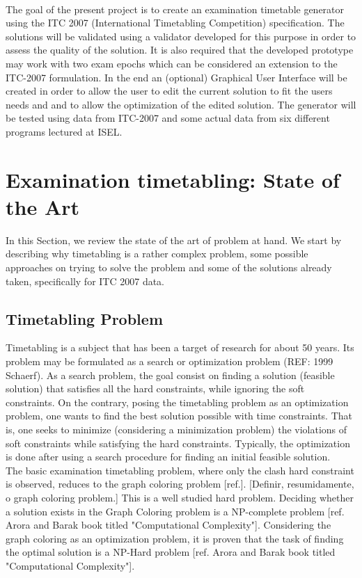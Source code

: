\\
The goal of the present project is to create an examination timetable generator using the ITC 2007 (International Timetabling Competition) specification. The solutions will be validated using a validator developed for this purpose in order to assess the quality of the solution. It is also required that the developed prototype may work with two exam epochs which can be considered an extension to the ITC-2007 formulation. In the end an (optional) Graphical User Interface will be created in order to allow the user to edit the current solution to fit the users needs and and to allow the optimization of the edited solution. The generator will be tested using data from ITC-2007 and some actual data from six different programs lectured at ISEL.
\section{Examination timetabling: State of the Art}
\label{sec:sota}
In this Section, we review the state of the art of problem at hand. We start by describing why timetabling is a rather complex problem, some possible approaches on trying to solve the problem and some of the solutions already taken, specifically for ITC 2007 data.
\\
\subsection{Timetabling Problem}
Timetabling is a subject that has been a target of research for about 50 years. Its problem may be formulated as a search or optimization problem (REF: 1999 Schaerf). As a search problem, the goal consist on finding a solution (feasible solution) that satisfies all the hard constraints, while ignoring the soft constraints. On the contrary, posing the timetabling problem as an optimization problem, one wants to find the best solution possible with time constraints. That is, one seeks to minimize (considering a minimization problem) the violations of soft constraints while satisfying the hard
constraints. Typically, the optimization is done after using a search procedure for finding an initial feasible solution.
\\
The basic examination timetabling problem, where only the clash hard constraint is observed, reduces to the graph coloring problem [ref.]. 
[Definir, resumidamente, o graph coloring problem.]
This is a well studied hard problem. Deciding whether a solution exists in the Graph Coloring problem is a NP-complete problem [ref. Arora and Barak book titled "Computational Complexity"]. Considering the graph coloring as an optimization problem, it is proven that the task of finding the optimal solution is a NP-Hard problem [ref. Arora and Barak book titled "Computational Complexity"].
\\

